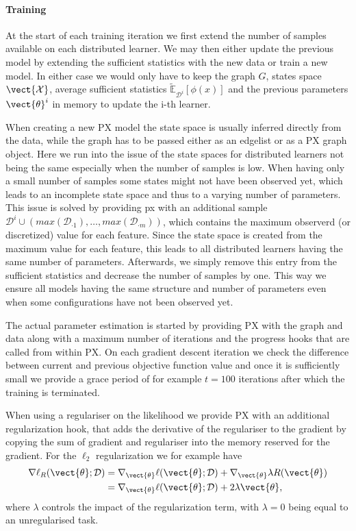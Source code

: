 \paragraph*{Training}
At the start of each training iteration we first extend the number of samples available on each distributed learner. 
We may then either update the previous model by extending the sufficient statistics with the new data or train a new model. 
In either case we would only have to keep the graph $G$, states space $\vect{\mathcal{X}}$, average sufficient statistics $\tilde{\mathbb{E}}_{\mathcal{D}^i}[\phi(x)]$ and the previous parameters $\vect{\theta}^i$ in memory to update the i-th learner.

When creating a new PX model the state space is usually inferred directly from the data, while the graph has to be passed either as an edgelist or as a PX graph object. 
Here we run into the issue of the state spaces for distributed learners not being the same especially when the number of samples is low. 
When having only a small number of samples some states might not have been observed yet, which leads to an incomplete state space and thus to a varying number of parameters. 
This issue is solved by providing px with an additional sample $\mathcal{D}^i \cup (max(\mathcal{D}_{\cdot 1}), \ldots, max(\mathcal{D}_{\cdot m}))$, which contains the maximum observerd (or discretized) value for each feature.
Since the state space is created from the maximum value for each feature, this leads to all distributed learners having the same number of parameters.
Afterwards, we simply remove this entry from the sufficient statistics and decrease the number of samples by one. 
This way we ensure all models having the same structure and number of parameters even when some configurations have not been observed yet.

The actual parameter estimation is started by providing PX with the graph and data along with a maximum number of iterations and the progress hooks that are called from within PX.
On each gradient descent iteration we check the difference between current and previous objective function value and once it is sufficiently small we provide a grace period of for example $t=100$ iterations after which the training is terminated.

When using a regulariser on the likelihood we provide PX with an additional regularization hook, that  adds the derivative of the regulariser to the gradient by copying the sum of gradient and regulariser into the memory reserved for the gradient. 
For the $\ell_2$ regularization we for example have 
\begin{equation}
    \begin{split}
    \nabla \ell_R( \vect{\theta}; \mathcal{D}) &= \nabla_{\vect{\theta}} \ell( \vect{\theta}; \mathcal{D}) +  \nabla_{\vect{\theta}}\lambda R(\vect{\theta}) \\
    &=\nabla_{\vect{\theta}} \ell( \vect{\theta}; \mathcal{D}) +  2\lambda \vect{\theta},
    \end{split}
\end{equation} 
where $\lambda$ controls the impact of the regularization term, with $\lambda=0$ being equal to an unregularised task.

